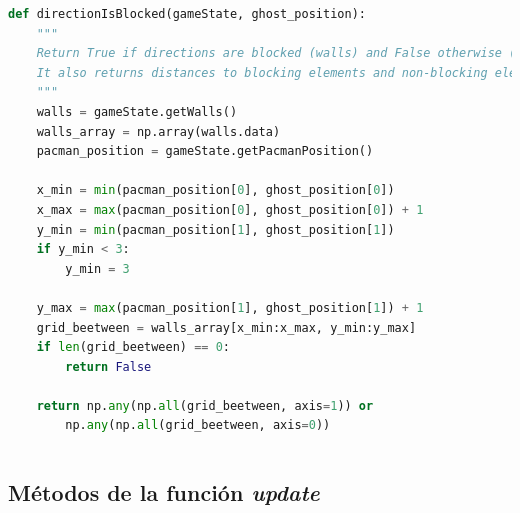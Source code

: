 \documentclass[11pt]{exam}
\begin{document}
\begin{lstlisting}[language=python, basicstyle=\footnotesize]
def directionIsBlocked(gameState, ghost_position):
	"""
	Return True if directions are blocked (walls) and False otherwise (no walls).
	It also returns distances to blocking elements and non-blocking elements.
	"""
	walls = gameState.getWalls()
	walls_array = np.array(walls.data)
	pacman_position = gameState.getPacmanPosition()
	
	x_min = min(pacman_position[0], ghost_position[0])
	x_max = max(pacman_position[0], ghost_position[0]) + 1
	y_min = min(pacman_position[1], ghost_position[1])
	if y_min < 3:
		y_min = 3
	
	y_max = max(pacman_position[1], ghost_position[1]) + 1
	grid_beetween = walls_array[x_min:x_max, y_min:y_max]
	if len(grid_beetween) == 0:
		return False
	
	return np.any(np.all(grid_beetween, axis=1)) or 
		np.any(np.all(grid_beetween, axis=0))
\end{lstlisting}

\begin{lstlisting}[language=python, basicstyle=\footnotesize]

\end{lstlisting}

\subsection{Métodos de la función \textit{update}}\label{apendice_update}
\end{document}
